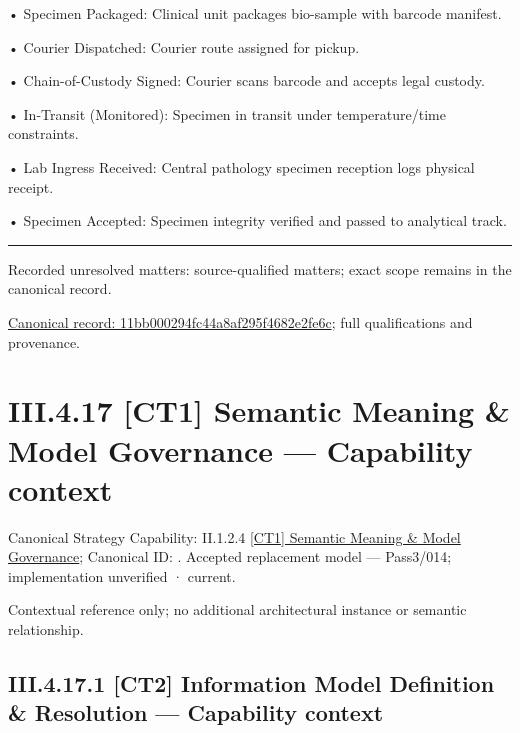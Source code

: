 •
Specimen Packaged: Clinical unit packages bio-sample with barcode manifest.



•
Courier Dispatched: Courier route assigned for pickup.



•
Chain-of-Custody Signed: Courier scans barcode and accepts legal custody.



•
In-Transit (Monitored): Specimen in transit under temperature/time constraints.



•
Lab Ingress Received: Central pathology specimen reception logs physical receipt.



•
Specimen Accepted: Specimen integrity verified and passed to analytical track.



\medskip\hrule\medskip

{\small Recorded unresolved matters: source-qualified matters; exact scope remains in the canonical record.}\par
{\footnotesize \href{../../../../../../../../continuum/business/business-process/11bb000294fc44a8af295f4682e2fe6c.md}{Canonical record: 11bb000294fc44a8af295f4682e2fe6c}; full qualifications and provenance.}\par
\section*{III.4.17 [CT1] Semantic Meaning \& Model Governance — Capability context}
\label{navigation:III.4.17}

{\small Canonical Strategy Capability: II.1.2.4 \hyperref[element:cc25d325f7104ccda137cbf6ee371fb3]{[CT1] Semantic Meaning \& Model Governance}; Canonical ID: \texttt{}. Accepted replacement model — Pass3/014; implementation unverified · current.}\par
Contextual reference only; no additional architectural instance or semantic relationship.\par
\subsection*{III.4.17.1 [CT2] Information Model Definition \& Resolution — Capability context}
\label{navigation:III.4.17.1}

